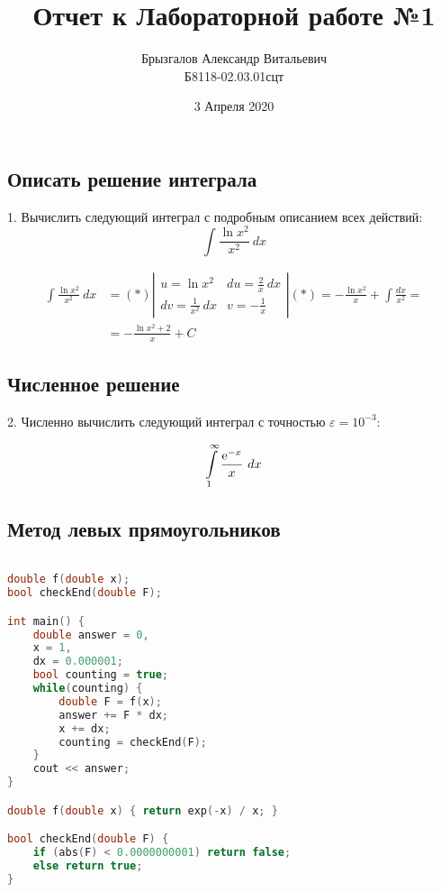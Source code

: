 \documentclass[14pt, titlepage, fleqn]{extarticle}
\title{Отчет к Лабораторной работе №1}
\author{Брызгалов Александр Витальевич\\Б8118-02.03.01сцт}
\date{3 Апреля 2020}
\begin{document}
	
	\maketitle
	
	\tableofcontents
	
	\newpage
	\subsection*{Описать решение интеграла}

	1. Вычислить следующий интеграл с подробным описанием всех действий:
	\[\int \frac{\ln x^2}{x^2} ~ dx\]
	
	\begin{equation*}
		\begin{aligned}
			\int \frac{\ln x^2}{x^2} ~ dx &= (*) \left \vert
				\begin{matrix}
					u = \ln x^2 & du = \frac{2}{x}~dx\\
					dv = \frac{1}{x^2} ~ dx  & v = -\frac{1}{x}
				\end{matrix}
			\right \vert (*) = -\frac{\ln x^2}{x} + \int \frac{dx}{x^2} = \\ 
			&= -\frac{\ln x^2 + 2}{x} + C
		\end{aligned}
	\end{equation*}

	\newpage
	\subsection*{Численное решение}

	2. Численно вычислить следующий интеграл с точностью $\varepsilon = 10^{-3}$:

	\[\int\limits_1^\infty  \frac{{\rm e}^{-x}}{x} ~ dx\]
	\subsection*{Метод левых прямоугольников}
	\begin{lstlisting}[language=C++, basicstyle=\footnotesize\ttfamily, frame = single]

double f(double x);
bool checkEnd(double F);

int main() {
	double answer = 0, 
	x = 1, 
	dx = 0.000001;
	bool counting = true;
	while(counting) {		
		double F = f(x);
		answer += F * dx;
		x += dx;
		counting = checkEnd(F);		
	}
	cout << answer;
}

double f(double x) { return exp(-x) / x; }

bool checkEnd(double F) {
	if (abs(F) < 0.0000000001) return false;
	else return true;
}
	
	\end{lstlisting}
		
\end{document}
